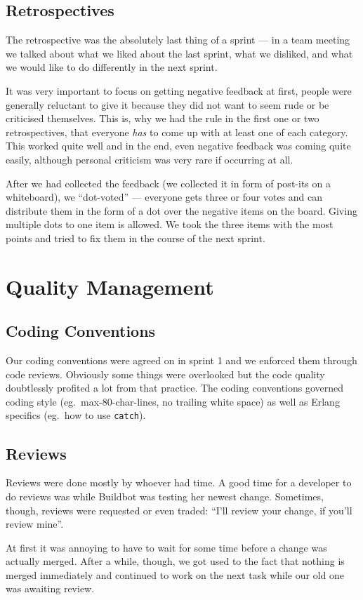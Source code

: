 \documentclass[11pt,a4paper]{report}
\begin{document}
\subsection{Retrospectives}
The retrospective was the absolutely last thing of a sprint --- in a team
meeting we talked about what we liked about the last sprint, what we disliked,
and what we would like to do differently in the next sprint.

It was very important to focus on getting negative feedback at first, people
were generally reluctant to give it because they did not want to seem rude or
be criticised themselves. This is, why we had the rule in the first one or two
retrospectives, that everyone {\em has\/} to come up with at least one of each
category. This worked quite well and in the end, even negative feedback was
coming quite easily, although personal criticism was very rare if occurring at
all.

After we had collected the feedback (we collected it in form of post-its on a
whiteboard), we ``dot-voted'' --- everyone gets three or four votes and can
distribute them in the form of a dot over the negative items on the board.
Giving multiple dots to one item is allowed. We took the three items with the
most points and tried to fix them in the course of the next sprint.
\section{Quality Management}
\subsection*{Coding Conventions}
Our coding conventions were agreed on in sprint 1 and we enforced them through
code reviews. Obviously some things were overlooked but the code quality
doubtlessly profited a lot from that practice.
The coding conventions governed coding style (eg.\ max-80-char-lines, no
trailing white space) as well as Erlang specifics (eg.\ how to use {\tt catch}).
\subsection*{Reviews}
Reviews were done mostly by whoever had time. A good time for a developer to do
reviews was while Buildbot was testing her newest change. Sometimes, though,
reviews were requested or even traded: ``I'll review your change, if you'll
review mine''.

At first it was annoying to have to wait for some time before a change was
actually merged. After a while, though, we got used to the fact that nothing is
merged immediately and continued to work on the next task while our old one was
awaiting review.
\end{document}
